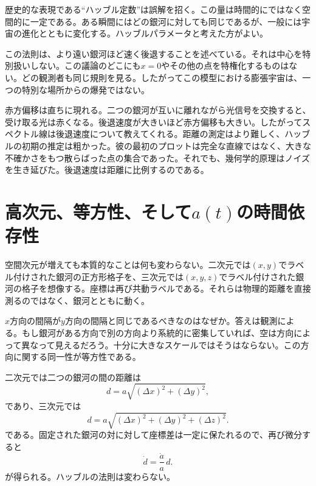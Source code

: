 歴史的な表現である``ハッブル定数''は誤解を招く。この量は時間的にではなく空間的に一定である。ある瞬間にはどの銀河に対しても同じであるが、一般には宇宙の進化とともに変化する。ハッブルパラメータと考えた方がよい。

この法則は、より遠い銀河ほど速く後退することを述べている。それは中心を特別扱いしない。この議論のどこにも\(x=0\)やその他の点を特権化するものはない。どの観測者も同じ規則を見る。したがってこの模型における膨張宇宙は、一つの特別な場所からの爆発ではない。

赤方偏移は直ちに現れる。二つの銀河が互いに離れながら光信号を交換すると、受け取る光は赤くなる。後退速度が大きいほど赤方偏移も大きい。したがってスペクトル線は後退速度について教えてくれる。距離の測定はより難しく、ハッブルの初期の推定は粗かった。彼の最初のプロットは完全な直線ではなく、大きな不確かさをもつ散らばった点の集合であった。それでも、幾何学的原理はノイズを生き延びた。後退速度は距離に比例するのである。

\begin{classroomqa}
\end{classroomqa}

\section{高次元、等方性、そして\(a(t)\)の時間依存性}

空間次元が増えても本質的なことは何も変わらない。二次元では\((x,y)\)でラベル付けされた銀河の正方形格子を、三次元では\((x,y,z)\)でラベル付けされた銀河の格子を想像する。座標は再び共動ラベルである。それらは物理的距離を直接測るのではなく、銀河とともに動く。

\(x\)方向の間隔が\(y\)方向の間隔と同じであるべきなのはなぜか。答えは観測による。もし銀河がある方向で別の方向より系統的に密集していれば、空は方向によって異なって見えるだろう。十分に大きなスケールではそうはならない。この方向に関する同一性が等方性である。

二次元では二つの銀河の間の距離は
\begin{equation}
d=a\sqrt{(\Delta x)^2+(\Delta y)^2},
\end{equation}
であり、三次元では
\begin{equation}
d=a\sqrt{(\Delta x)^2+(\Delta y)^2+(\Delta z)^2}.
\end{equation}
である。固定された銀河の対に対して座標差は一定に保たれるので、再び微分すると
\begin{equation}
\dot d=\frac{\dot a}{a}\,d.
\end{equation}
が得られる。ハッブルの法則は変わらない。

